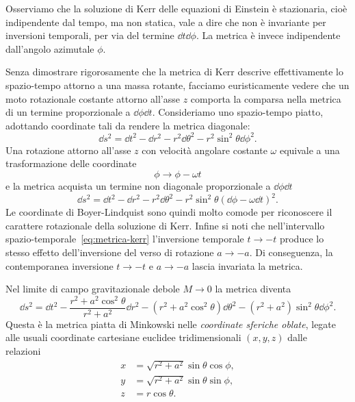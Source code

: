 Osserviamo che la soluzione di Kerr delle equazioni di Einstein è stazionaria,
cioè indipendente dal tempo, ma non statica, vale a dire che non è invariante
per inversioni temporali, per via del termine \(\dd t\dd\phi\).  La metrica è
invece indipendente dall'angolo azimutale \(\phi\).

Senza dimostrare rigorosamente che la metrica di Kerr descrive effettivamente lo
spazio-tempo attorno a una massa rotante, facciamo euristicamente vedere che un
moto rotazionale costante attorno all'asse \(z\) comporta la comparsa nella
metrica di un termine proporzionale a \(\dd\phi\dd t\).  Consideriamo uno
spazio-tempo piatto, adottando coordinate tali da rendere la metrica diagonale:
\begin{equation}
  \dd s^{2} = \dd t^{2} - \dd r^{2} - r^{2}\dd\theta^{2} -
  r^{2}\sin^{2}\theta\dd \phi^{2}.
\end{equation}
Una rotazione attorno all'asse \(z\) con velocità angolare costante \(\omega\)
equivale a una trasformazione delle coordinate
\begin{equation}
  \phi \to \phi - \omega t
\end{equation}
e la metrica acquista un termine non diagonale proporzionale a \(\dd\phi\dd t\)
\begin{equation}
  \dd s^{2} = \dd t^{2} - \dd r^{2} - r^{2}\dd\theta^{2} -
  r^{2}\sin^{2}\theta(\dd \phi - \omega\dd t)^{2}.
\end{equation}
Le coordinate di Boyer-Lindquist sono quindi molto comode per riconoscere il
carattere rotazionale della soluzione di Kerr.  Infine si noti che
nell'intervallo spazio-temporale~\eqref{eq:metrica-kerr} l'inversione temporale
\(t\to -t\) produce lo stesso effetto dell'inversione del verso di rotazione
\(a\to -a\).  Di conseguenza, la contemporanea inversione \(t\to -t\) e \(a\to
-a\) lascia invariata la metrica.

Nel limite di campo gravitazionale debole \(M\to 0\) la metrica diventa
\begin{equation}
  \dd s^{2} = \dd t^{2} - \frac{r^{2} + a^{2}\cos^{2}\theta}{r^{2} + a^{2}}\dd
  r^{2} - (r^{2} + a^{2}\cos^{2}\theta)\dd\theta^{2} - (r^{2} +
  a^{2})\sin^{2}\theta\dd\phi^{2}.
\end{equation}
Questa è la metrica piatta di Minkowski nelle 
\emph{coordinate sferiche oblate}, legate alle usuali coordinate cartesiane
euclidee tridimensionali \((x, y, z)\) dalle
relazioni~\parencite{2007arXiv0706.0622V}
\begin{subequations}
  \label{eq:boyer-lindquist-debole}
  \begin{align}
    x &= \sqrt{r^{2} + a^{2}}\sin\theta\cos\phi, \\
    y &= \sqrt{r^{2} + a^{2}}\sin\theta\sin\phi, \\
    z &= r\cos\theta.
  \end{align}
\end{subequations}

